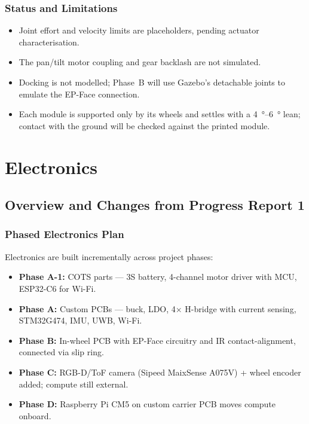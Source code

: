 \documentclass[12pt,a4paper]{article}
\begin{document}
\subsubsection{Status and Limitations}

\begin{itemize}
	\item Joint effort and velocity limits are placeholders, pending actuator characterisation.
	\item The pan/tilt motor coupling and gear backlash are not simulated.
	\item Docking is not modelled; Phase~B will use Gazebo's detachable joints to emulate the EP-Face connection.
	\item Each module is supported only by its wheels and settles with a \SIrange{4}{6}{\degree} lean; contact with the ground will be checked against the printed module.
\end{itemize}


\clearpage
\section{Electronics}
\label{sec:electronics}

\subsection{Overview and Changes from Progress Report 1}
\label{sec:elec-overview}

\subsubsection{Phased Electronics Plan}

Electronics are built incrementally across project phases:

\begin{itemize}
  \item \textbf{Phase A-1:} COTS parts --- 3S battery, 4-channel motor driver with MCU, ESP32-C6 for Wi-Fi.
  \item \textbf{Phase A:} Custom PCBs --- buck, LDO, 4$\times$ H-bridge with current sensing, STM32G474, IMU, UWB, Wi-Fi.
  \item \textbf{Phase B:} In-wheel PCB with EP-Face circuitry and IR contact-alignment, connected via slip ring.
  \item \textbf{Phase C:} RGB-D/ToF camera (Sipeed MaixSense A075V) + wheel encoder added; compute still external.
  \item \textbf{Phase D:} Raspberry Pi CM5 on custom carrier PCB moves compute onboard.
\end{itemize}
\end{document}
